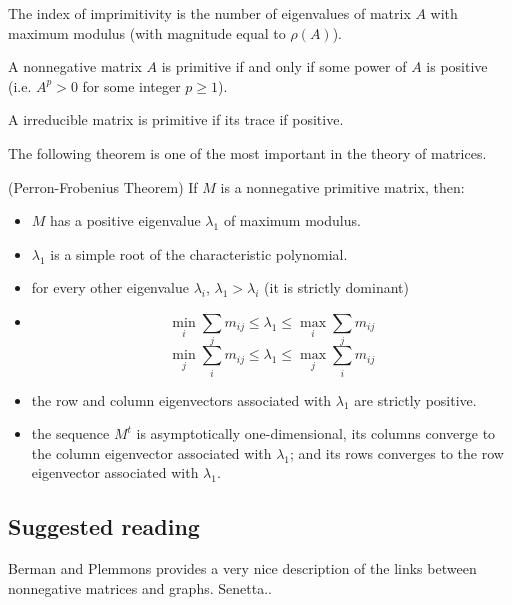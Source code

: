 The index of imprimitivity is the number of eigenvalues of matrix $A$ with maximum modulus (with magnitude equal to $\rho(A)$).

\begin{theorem}
A nonnegative matrix $A$ is primitive if and only if some power of $A$ is positive (i.e. $A^p>0$ for some integer $p\geq 1$).
\end{theorem}

\begin{theorem}\cite{BermanPlemmons1994}
A irreducible matrix is primitive if its trace if positive. 
\end{theorem}

The following theorem is one of the most important in the theory of matrices.
\begin{theorem}(Perron-Frobenius Theorem)
If $M$ is a nonnegative primitive matrix, then:
\begin{itemize}
\item $M$ has a positive eigenvalue $\lambda_1$ of maximum modulus.
\item $\lambda_1$ is a simple root of the characteristic polynomial.
\item for every other eigenvalue $\lambda _i$, $\lambda_1>\lambda_i$ (it is strictly dominant)
\item $$\min_{i}\sum_j m_{ij}\leq \lambda _1 \leq \max_{i}\sum_j m_{ij} $$
$$\min_{j}\sum_i m_{ij}\leq \lambda _1 \leq \max_{j}\sum_i m_{ij} $$
\item the row and column eigenvectors associated with $\lambda_1$ are strictly positive.
\item the sequence $M^t$ is asymptotically one-dimensional, its columns converge to the column eigenvector associated with $\lambda_1$; and its rows converges to the row eigenvector associated with $\lambda_1$.
\end{itemize}
\end{theorem}


\subsection{Suggested reading}
Berman and Plemmons \cite{BermanPlemmons1979,BermanPlemmons1994} provides a very nice description of the links between nonnegative matrices and graphs. Senetta.. 

